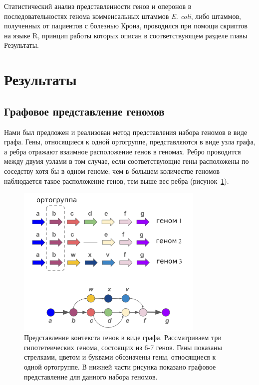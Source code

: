 Статистический анализ представленности генов и оперонов в последовательностях генома комменсальных штаммов \textit{E. coli}, либо штаммов, полученных от пациентов с болезнью Крона, проводился при помощи скриптов на языке R, принцип работы которых описан в соответствующем разделе главы Результаты.


\section*{Результаты}

\subsection*{Графовое представление геномов}

Нами был предложен и реализован метод представления набора геномов в виде графа. Гены, относящиеся к одной ортогруппе, представляются в виде узла графа, а ребра отражают взаимное расположение генов в геномах. Ребро проводится между двумя узлами в том случае, если соответствующие гены расположены по соседству хотя бы в одном геноме; чем в большем количестве геномов наблюдается такое расположение генов, тем выше вес ребра (рисунок~\ref{img:scheme}).

\begin{figure}[!ht] 
  \center
    \includegraphics[width=0.8\textwidth]{Dissertation/images/graph/graph_scheme.png}
  \caption{Представление контекста генов в виде графа. Рассматриваем три гипотетеических генома, состоящих из 6-7 генов. Гены показаны стрелками, цветом и буквами обозначены гены, относящиеся к одной ортогруппе. В нижней части рисунка показано графовое представление для данного набора геномов.}
  \label{img:scheme} 
\end{figure}

